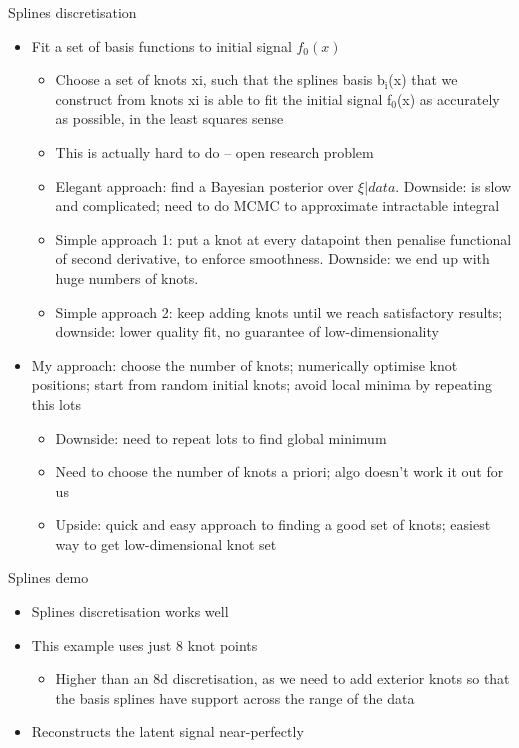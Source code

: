 \documentclass[presentation]{beamer}
\begin{document}
\begin{frame}[plain,label={sec:orgd6955eb}]{Splines discretisation}
\begin{itemize}
\item Fit a set of basis functions to initial signal \(f_0(x)\)
\begin{itemize}
\item \alert{Choose a set of knots xi, such that the splines basis b\(_{\text{i}}\)(x) that we construct from knots xi is able to fit the initial signal f\(_{\text{0}}\)(x) as accurately as possible, in the least squares sense}
\item This is actually hard to do -- open research problem
\item Elegant approach: find a Bayesian posterior over \(\xi | data\). Downside: is slow and complicated; need to do MCMC to approximate intractable integral
\item Simple approach 1: put a knot at every datapoint then penalise functional of second derivative, to enforce smoothness. Downside: we end up with huge numbers of knots.
\item Simple approach 2: keep adding knots  until we reach satisfactory results; downside: lower quality fit, no guarantee of low-dimensionality
\end{itemize}
\item My approach: choose the number of knots; numerically optimise knot positions; start from random initial knots; avoid local minima by repeating this lots
\begin{itemize}
\item Downside: need to repeat lots to find global minimum
\item Need to choose the number of knots a priori; algo doesn't work it out for us
\item Upside: quick and easy approach to finding a good set of knots; easiest way to get low-dimensional knot set
\end{itemize}
\end{itemize}
\end{frame}
\begin{frame}[plain,label={sec:org36930a4}]{Splines demo}
\begin{itemize}
\item Splines discretisation works well
\item This example uses just 8 knot points
\begin{itemize}
\item Higher than an 8d discretisation, as we need to add exterior knots so that the basis splines have support across the range of the data
\end{itemize}
\item Reconstructs the latent signal near-perfectly
\end{itemize}
\end{frame}
\end{document}
